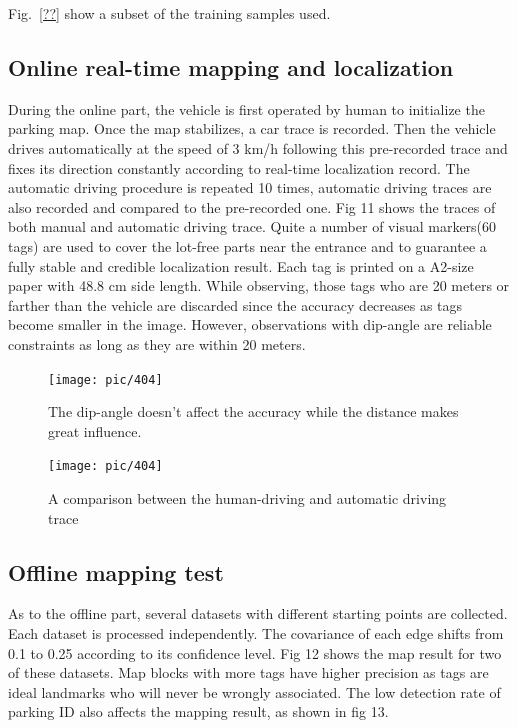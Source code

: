 \documentclass[journal]{IEEEtran}
\newcommand{\Reffig}[1]{Fig.~\ref{#1}}
\begin{document}
\Reffig{??} show a subset of the training samples used.



\subsection{Online real-time mapping and localization}
During the online part, the vehicle is first operated by human to initialize the parking map. 
Once the map stabilizes, a car trace is recorded.
Then the vehicle drives automatically at the speed of 3 km/h following this pre-recorded trace and fixes its direction constantly according to real-time localization record.
The automatic driving procedure is repeated 10 times, automatic driving traces are also recorded and compared to the pre-recorded one.
Fig 11 shows the traces of both manual and automatic driving trace.
Quite a number of visual markers(60 tags) are used to cover the lot-free parts near the entrance and to guarantee a fully stable and credible localization result.
Each tag is printed on a A2-size paper with 48.8 cm side length.
While observing, those tags who are 20 meters or farther than the vehicle are discarded since the accuracy decreases as tags become smaller in the image.
However, observations with dip-angle are reliable constraints as long as they are within 20 meters.

\begin{figure}[htbp]
\centering
\texttt{[image: pic/404]}
\caption{
The dip-angle doesn't affect the accuracy while the distance makes great influence.%
}\label{fig:10}
\end{figure}

\begin{figure}[htbp]
\centering
\texttt{[image: pic/404]}
\caption{
A comparison between the human-driving and automatic driving trace%
}\label{fig:11}
\end{figure}

\subsection{Offline mapping test}
As to the offline part, several datasets with different starting points are collected. 
Each dataset is processed independently.
The covariance of each edge shifts from 0.1 to 0.25 according to its confidence level.
Fig 12 shows the map result for two of these datasets.
Map blocks with more tags have higher precision as tags are ideal landmarks who will never be wrongly associated.
The low detection rate of parking ID also affects the mapping result, as shown in fig 13.
\end{document}
